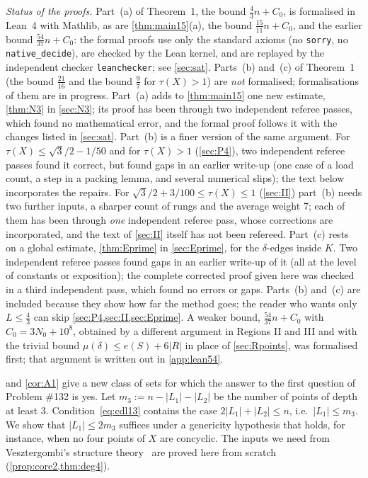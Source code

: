 \documentclass[11pt]{amsart}
\theoremstyle{definition}
\theoremstyle{remark}
\newcommand{\mult}{\mu}
\begin{document}
\emph{Status of the proofs.} Part~(a) of Theorem~1, the bound $\frac43n+C_0$, is formalised in Lean~4 with Mathlib, as are \cref{thm:main15}(a), the bound $\frac{15}{11}n+C_0$, and the earlier bound $\frac{54}{37}n+C_0$: the formal proofs use only the standard axioms (no \texttt{sorry}, no \texttt{native\_decide}), are checked by the Lean kernel, and are replayed by the independent checker \texttt{leanchecker}; see \cref{sec:sat}. Parts~(b) and~(c) of Theorem~1 (the bound $\frac{21}{16}$ and the bound $\frac97$ for $\tau(X)>1$) are \emph{not} formalised; formalisations of them are in progress. Part~(a) adds to \cref{thm:main15} one new estimate, \cref{thm:N3} in \cref{sec:N3}; its proof has been through two independent referee passes, which found no mathematical error, and the formal proof follows it with the changes listed in \cref{sec:sat}. Part~(b) is a finer version of the same argument. For $\tau(X)\le\sqrt3/2-1/50$ and for $\tau(X)>1$ (\cref{sec:P4}), two independent referee passes found it correct, but found gaps in an earlier write-up (one case of a load count, a step in a packing lemma, and several numerical slips); the text below incorporates the repairs. For $\sqrt3/2+3/100\le\tau(X)\le1$ (\cref{sec:II}) part~(b) needs two further inputs, a sharper count of rungs and the average weight $7$; each of them has been through \emph{one} independent referee pass, whose corrections are incorporated, and the text of \cref{sec:II} itself has not been refereed. Part~(c) rests on a global estimate, \cref{thm:Eprime} in \cref{sec:Eprime}, for the $\delta$-edges inside $K$. Two independent referee passes found gaps in an earlier write-up of it (all at the level of constants or exposition); the complete corrected proof given here was checked in a third independent pass, which found no errors or gaps. Parts~(b) and~(c) are included because they show how far the method goes; the reader who wants only $L\le\frac43$ can skip \cref{sec:P4,sec:II,sec:Eprime}. A weaker bound, $\frac{54}{37}n+C_0$ with $C_0=3N_0+10^8$, obtained by a different argument in Regions II and III and with the trivial bound $\mult(\delta)\le e(S)+6|R|$ in place of \cref{sec:Rpoints}, was formalised first; that argument is written out in \cref{app:lean54}.

 and \cref{cor:A1} give a new class of sets for which the answer to the first question of Problem \#132 is yes. Let $m_3:=n-|L_1|-|L_2|$ be the number of points of depth at least $3$. Condition~\eqref{eq:cdl13} contains the case $2|L_1|+|L_2|\le n$, i.e.\ $|L_1|\le m_3$. We show that $|L_1|\le 2m_3$ suffices under a genericity hypothesis that holds, for instance, when no four points of $X$ are concyclic. The inputs we need from Vesztergombi's structure theory~\cite{Ve96} are proved here from scratch (\cref{prop:core2,thm:deg4}).
\end{document}
